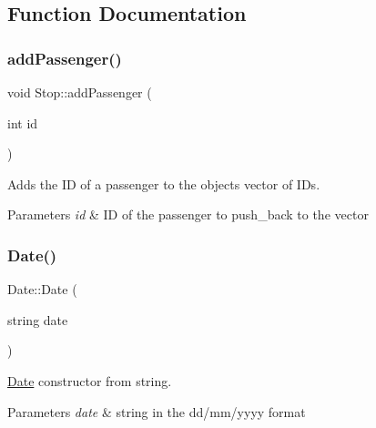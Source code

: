 \subsection{Function Documentation}
\mbox{\label{group___date_gac636e3c0c1e2794575bd3db14b5ee363}} 
\subsubsection{\texorpdfstring{add\+Passenger()}{addPassenger()}}
{\footnotesize\ttfamily void Stop\+::add\+Passenger (\begin{DoxyParamCaption}\item[{int}]{id }\end{DoxyParamCaption})}



Adds the ID of a passenger to the object\textquotesingle{}s vector of I\+Ds. 


\begin{DoxyParams}{Parameters}
{\em id} & ID of the passenger to push\+\_\+back to the vector \\
\hline
\end{DoxyParams}
\mbox{\label{group___date_ga5532efafed41fd5f8e013a61313200dc}} 
\subsubsection{\texorpdfstring{Date()}{Date()}\hspace{0.1cm}{\footnotesize\ttfamily [1/2]}}
{\footnotesize\ttfamily Date\+::\+Date (\begin{DoxyParamCaption}\item[{string}]{date }\end{DoxyParamCaption})}



\hyperlink{class_date}{Date} constructor from string. 


\begin{DoxyParams}{Parameters}
{\em date} & string in the dd/mm/yyyy format \\
\hline
\end{DoxyParams}
\mbox{\label{group___date_gab1ad19969fa570605a6b0cd32b0da822}} 
